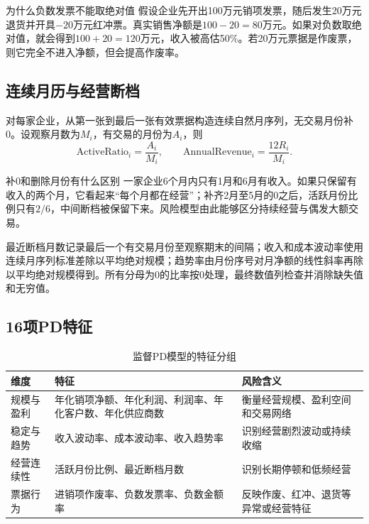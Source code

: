 \documentclass[12pt,a4paper]{ctexart}
\begin{document}
\begin{intuitionbox}{为什么负数发票不能取绝对值}
假设企业先开出100万元销项发票，随后发生20万元退货并开具$-20$万元红冲票。真实销售净额是$100-20=80$万元。如果对负数取绝对值，就会得到$100+20=120$万元，收入被高估50\%。若20万元票据是作废票，则它完全不进入净额，但会提高作废率。
\end{intuitionbox}

\subsection{连续月历与经营断档}

对每家企业，从第一张到最后一张有效票据构造连续自然月序列，无交易月份补0。设观察月数为$M_i$，有交易的月份为$A_i$，则
\begin{equation}
\mathrm{ActiveRatio}_i=\frac{A_i}{M_i},\qquad
\mathrm{AnnualRevenue}_i=\frac{12R_i}{M_i}.
\end{equation}

\begin{intuitionbox}{补0和删除月份有什么区别}
一家企业6个月内只有1月和6月有收入。如果只保留有收入的两个月，它看起来“每个月都在经营”；补齐2月至5月的0之后，活跃月份比例只有$2/6$，中间断档被保留下来。风险模型由此能够区分持续经营与偶发大额交易。
\end{intuitionbox}

最近断档月数记录最后一个有交易月份至观察期末的间隔；收入和成本波动率使用连续月序列标准差除以平均绝对规模；趋势率由月份序号对月净额的线性斜率再除以平均绝对规模得到。所有分母为0的比率按0处理，最终数值列检查并消除缺失值和无穷值。

\subsection{16项PD特征}

\begin{table}[H]
\centering
\caption{监督PD模型的特征分组}
\small
\begin{tabular}{p{2.4cm}p{5.1cm}p{6.0cm}}
\toprule
维度 & 特征 & 风险含义\\
\midrule
规模与盈利 & 年化销项净额、年化利润、利润率、年化客户数、年化供应商数 & 衡量经营规模、盈利空间和交易网络\\
稳定与趋势 & 收入波动率、成本波动率、收入趋势率 & 识别经营剧烈波动或持续收缩\\
经营连续性 & 活跃月份比例、最近断档月数 & 识别长期停顿和低频经营\\
票据行为 & 进销项作废率、负数发票率、负数金额率 & 反映作废、红冲、退货等异常或经营特征\\
\bottomrule
\end{tabular}
\end{table}
\end{document}
